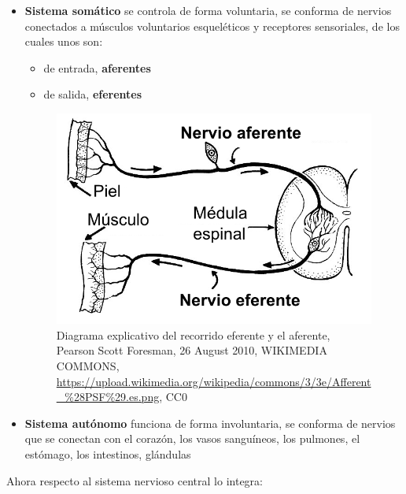\begin{itemize}
 \item \textbf{Sistema somático} se controla de forma voluntaria, se conforma de nervios conectados a músculos voluntarios esqueléticos y receptores sensoriales, de los cuales unos son:
 \begin{itemize}
  \item de entrada, \textbf{aferentes}
  \item de salida, \textbf{eferentes}
 \end{itemize}


 \begin{figure}[h]
 \centering
 \includegraphics[scale=0.5]{../Figuras/afferent_efferent.png}
 \caption{Diagrama explicativo del recorrido eferente y el aferente, Pearson Scott Foresman, 26 August 2010, WIKIMEDIA COMMONS, \url{https://upload.wikimedia.org/wikipedia/commons/3/3e/Afferent_\%28PSF\%29.es.png}, CC0}
 \label{axonesSA}
 \end{figure} 
 
\item \textbf{Sistema autónomo} funciona de forma involuntaria, se conforma de nervios que se conectan con el corazón, los vasos sanguíneos, los pulmones, el estómago, los intestinos, glándulas
\end{itemize}


Ahora respecto al sistema nervioso central lo integra:


